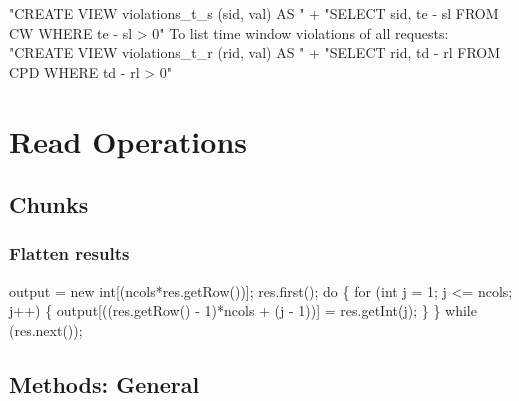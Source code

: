 "CREATE VIEW violations_t_s (sid, val) AS "
  + "SELECT sid, te - sl FROM CW WHERE te - sl > 0"
\nwendcode{}\nwdocspar
To list time window violations of all requests:
\nwenddocs{}\endmoddef{}
"CREATE VIEW violations_t_r (rid, val) AS "
  + "SELECT rid, td - rl FROM CPD WHERE td - rl > 0"
\nwendcode{}\nwdocspar
\nwenddocs{}\chapter{Read Operations}
\label{read}

\section{Chunks}

\subsection{Flatten results}
\nwenddocs{}\endmoddef{}
output = new int[(ncols*res.getRow())];
res.first();
do \{
  for (int j = 1; j <= ncols; j++) \{
    output[((res.getRow() - 1)*ncols + (j - 1))] = res.getInt(j);
  \}
\} while (res.next());
\nwendcode{}\nwdocspar

\section{Methods: General}


